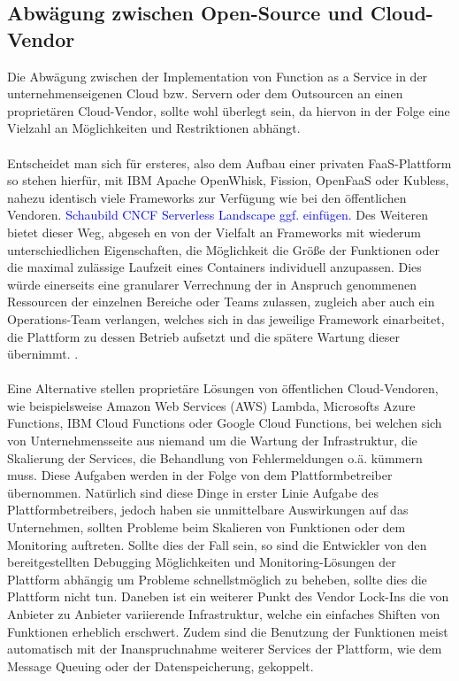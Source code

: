 \subsection{Abwägung zwischen Open-Source und Cloud-Vendor}
Die Abwägung zwischen der Implementation von Function as a Service in der unternehmenseigenen Cloud bzw. Servern oder dem Outsourcen an einen proprietären Cloud-Vendor, sollte wohl überlegt sein, da hiervon in der Folge eine Vielzahl an Möglichkeiten und Restriktionen abhängt. \\\\
Entscheidet man sich für ersteres, also dem Aufbau einer privaten FaaS-Plattform so stehen hierfür, mit IBM Apache OpenWhisk, Fission, OpenFaaS oder Kubless, nahezu identisch viele Frameworks zur Verfügung wie bei den öffentlichen Vendoren. \textcolor{blue}{Schaubild CNCF Serverless Landscape ggf. einfügen.} Des Weiteren bietet dieser Weg, abgeseh en von der Vielfalt an Frameworks mit wiederum unterschiedlichen Eigenschaften, die Möglichkeit die Größe der Funktionen oder die maximal zulässige Laufzeit eines Containers individuell anzupassen. Dies würde einerseits eine granularer Verrechnung der in Anspruch genommenen Ressourcen der einzelnen Bereiche oder Teams zulassen, zugleich aber auch ein Operations-Team verlangen, welches sich in das jeweilige Framework einarbeitet, die Plattform zu dessen Betrieb aufsetzt und die spätere Wartung dieser übernimmt. \cite{mohanty2018evaluation}.\\\\
Eine Alternative stellen proprietäre Lösungen von öffentlichen Cloud-Vendoren, wie beispielsweise Amazon Web Services (AWS) Lambda, Microsofts Azure Functions, IBM Cloud Functions oder Google Cloud Functions, bei welchen sich von Unternehmensseite aus niemand um die Wartung der Infrastruktur, die Skalierung der Services, die Behandlung von Fehlermeldungen o.ä. kümmern muss. Diese Aufgaben werden in der Folge von dem Plattformbetreiber übernommen. Natürlich sind diese Dinge in erster Linie Aufgabe des Plattformbetreibers, jedoch haben sie unmittelbare Auswirkungen auf das Unternehmen, sollten Probleme beim Skalieren von Funktionen oder dem Monitoring auftreten. Sollte dies der Fall sein, so sind die Entwickler von den bereitgestellten Debugging Möglichkeiten und Monitoring-Lösungen der Plattform abhängig um Probleme schnellstmöglich zu beheben, sollte dies die Plattform nicht tun. Daneben ist ein weiterer Punkt des Vendor Lock-Ins die von Anbieter zu Anbieter variierende Infrastruktur, welche ein einfaches Shiften von Funktionen erheblich erschwert. Zudem sind die Benutzung der Funktionen meist automatisch mit der Inanspruchnahme weiterer Services der Plattform, wie dem Message Queuing oder der Datenspeicherung, gekoppelt. \\\\
